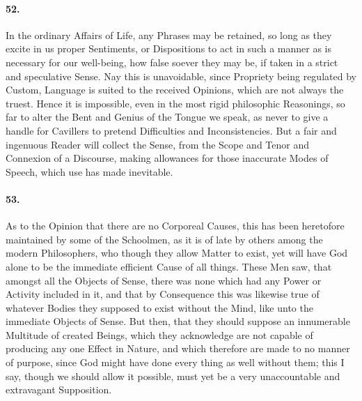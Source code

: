 \documentclass[]{article}
\newenvironment{sectionbody}{\begin{multicols}{2}}{\end{multicols}}
\begin{document}
\begin{sectionbody}
\paragraph{52.} In the ordinary Affairs of Life, any Phrases may be retained, so
long as they excite in us proper Sentiments, or Dispositions to
act in such a manner as is necessary for our well-being, how
false soever they may be, if taken in a strict and speculative
Sense.  Nay this is unavoidable, since Propriety being regulated
by Custom, Language is suited to the received Opinions, which are
not always the truest.  Hence it is impossible, even in the most
rigid philosophic Reasonings, so far to alter the Bent and Genius
of the Tongue we speak, as never to give a handle for Cavillers
to pretend Difficulties and Inconsistencies.  But a fair and
ingenuous Reader will collect the Sense, from the Scope and Tenor
and Connexion of a Discourse, making allowances for those
inaccurate Modes of Speech, which use has made inevitable.



\paragraph{53.} As to the Opinion that there are no Corporeal Causes, this has
been heretofore maintained by some of the Schoolmen, as it is of
late by others among the modern Philosophers, who though they
allow Matter to exist, yet will have {\sc God} alone to be the
immediate efficient Cause of all things.  These Men saw, that
amongst all the Objects of Sense, there was none which had any
Power or Activity included in it, and that by Consequence this
was likewise true of whatever Bodies they supposed to exist
without the Mind, like unto the immediate Objects of Sense.  But
then, that they should suppose an innumerable Multitude of
created Beings, which they acknowledge are not capable of
producing any one Effect in Nature, and which therefore are made
to no manner of purpose, since God might have done every thing as
well without them; this I say, though we should allow it
possible, must yet be a very unaccountable and extravagant
Supposition.




\end{sectionbody}
\end{document}
